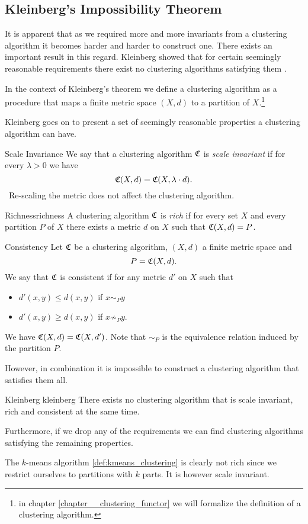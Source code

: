 \subsection{Kleinberg's Impossibility Theorem}
It is apparent that as we required more and more invariants from a clustering algorithm it becomes harder and harder to construct one.
There exists an important result in this regard.
Kleinberg showed that for certain seemingly reasonable requirements there exist no clustering algorithms satisfying them \cite{Kleinberg2002}.

In the context of Kleinberg's theorem we define a clustering algorithm as a procedure that maps a finite metric space $(X,d)$ to a partition of $X$.\footnote{in chapter \ref{chapter__clustering_functor} we will formalize the definition of a clustering algorithm.}

Kleinberg goes on to present a set of seemingly reasonable properties a clustering algorithm can have.

\begin{definition}{Scale Invariance}{}
We say that a clustering algorithm $\mathfrak{C}$ is \emph{scale invariant} if for every $\lambda > 0$ we have
$$
\mathfrak{C}(X,d) = \mathfrak{C}(X, \lambda \cdot d).
$$
\Ie\ Re-scaling the metric does not affect the clustering algorithm.
\end{definition}

\begin{definition}{Richness}{richness}
A clustering algorithm $\mathfrak{C}$ is \emph{rich} if for every set $X$ and every partition $P$ of $X$ there exists a metric $d$ on $X$ such that $\mathfrak{C}(X,d) = P$.
\end{definition}

\begin{definition}{Consistency}{}
Let $\mathfrak{C}$ be a clustering algorithm, $(X,d)$ a finite metric space and
$$
P = \mathfrak{C}(X,d).
$$
We say that $\mathfrak{C}$ is consistent if for any metric $d'$ on $X$ such that
\begin{itemize}
    \item $d'(x,y) \leq d(x,y)$ if $x\sim_P y$
    \item $d'(x,y) \geq d(x,y)$ if $x \not\sim_P y$.
\end{itemize}
We have $\mathfrak{C}(X,d) = \mathfrak{C}(X,d')$. Note that $\sim_P$ is the equivalence relation induced by the partition $P$.
\end{definition}


However, in combination it is impossible to construct a clustering algorithm that satisfies them all.


\begin{theorem}{Kleinberg \cite[Theorem~2.1]{Kleinberg2002}}{kleinberg}
There exists no clustering algorithm that is scale invariant, rich and consistent at the same time.
\end{theorem}

Furthermore, if we drop any of the requirements we can find clustering algorithms satisfying the remaining properties.

The $k$-means algorithm \ref{def:kmeans_clustering} is clearly not rich since we restrict ourselves to partitions with $k$ parts. It is however scale invariant.


